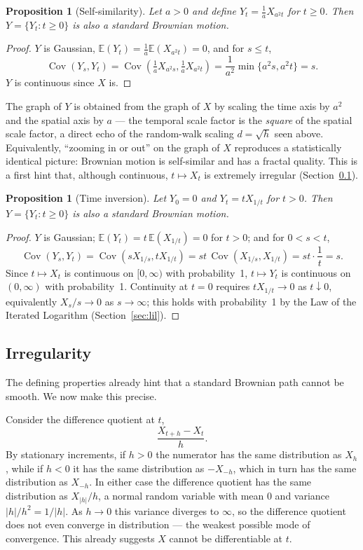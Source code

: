 \documentclass[12pt,openany]{book}
\newtheorem{proposition}[theorem]{Proposition}
\theoremstyle{definition}
\theoremstyle{remark}
\newcommand{\E}{\mathbb{E}}
\DeclareMathOperator{\Cov}{Cov}
\begin{document}
\begin{proposition}[Self-similarity]
Let $a>0$ and define $Y_t = \frac1a X_{a^2 t}$ for $t \ge 0$. Then $Y = \{Y_t : t \ge 0\}$ is also a standard Brownian motion.
\end{proposition}
\begin{proof}
$Y$ is Gaussian, $\E(Y_t) = \frac1a \E(X_{a^2t}) = 0$, and for $s\le t$,
\[
    \Cov(Y_s,Y_t) = \Cov\!\left(\tfrac1a X_{a^2s}, \tfrac1a X_{a^2t}\right) = \frac{1}{a^2}\min\{a^2 s, a^2 t\} = s.
\]
$Y$ is continuous since $X$ is.
\end{proof}
 
The graph of $Y$ is obtained from the graph of $X$ by scaling the time axis by $a^2$ and the spatial axis by $a$ — the temporal scale factor is the \emph{square} of the spatial scale factor, a direct echo of the random-walk scaling $d = \sqrt{h}$ seen above. Equivalently, ``zooming in or out'' on the graph of $X$ reproduces a statistically identical picture: Brownian motion is self-similar and has a fractal quality. This is a first hint that, although continuous, $t \mapsto X_t$ is extremely irregular (Section~\ref{sec:irregularity}).
 
\begin{proposition}[Time inversion]
Let $Y_0 = 0$ and $Y_t = t X_{1/t}$ for $t>0$. Then $Y = \{Y_t : t\ge 0\}$ is also a standard Brownian motion.
\end{proposition}
\begin{proof}
$Y$ is Gaussian; $\E(Y_t) = t\,\E(X_{1/t}) = 0$ for $t>0$; and for $0<s<t$,
\[
    \Cov(Y_s,Y_t) = \Cov(sX_{1/s}, tX_{1/t}) = st\,\Cov(X_{1/s},X_{1/t}) = st \cdot \frac1t = s.
\]
Since $t \mapsto X_t$ is continuous on $[0,\infty)$ with probability~1, $t \mapsto Y_t$ is continuous on $(0,\infty)$ with probability~1. Continuity at $t=0$ requires $tX_{1/t} \to 0$ as $t \downarrow 0$, equivalently $X_s/s \to 0$ as $s \to \infty$; this holds with probability~1 by the Law of the Iterated Logarithm (Section~\ref{sec:lil}).
\end{proof}
 
\subsection{Irregularity}
\label{sec:irregularity}
 
The defining properties already hint that a standard Brownian path cannot be smooth. We now make this precise.
 
Consider the difference quotient at $t$,
\begin{equation}
    \frac{X_{t+h} - X_t}{h}. \tag{18.1.11}
\end{equation}
By stationary increments, if $h>0$ the numerator has the same distribution as $X_h$, while if $h<0$ it has the same distribution as $-X_{-h}$, which in turn has the same distribution as $X_{-h}$. In either case the difference quotient has the same distribution as $X_{|h|}/h$, a normal random variable with mean $0$ and variance $|h|/h^2 = 1/|h|$. As $h \to 0$ this variance diverges to $\infty$, so the difference quotient does not even converge in distribution — the weakest possible mode of convergence. This already suggests $X$ cannot be differentiable at $t$.
 
\end{document}
